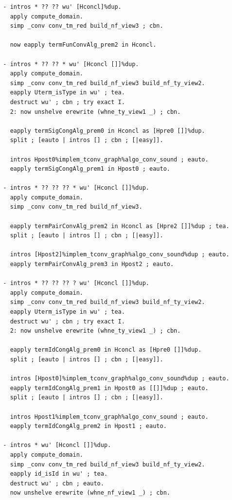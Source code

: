 \documentclass[10pt,a4paper]{amsart}
\begin{document}
\begin{lstlisting}
  - intros * ?? ?? wu' [Hconcl]%dup.
    apply compute_domain.
    simp _conv conv_tm_red build_nf_view3 ; cbn.

    now eapply termFunConvAlg_prem2 in Hconcl.

  - intros * ?? ?? * wu' [Hconcl []]%dup.
    apply compute_domain.
    simp _conv conv_tm_red build_nf_view3 build_nf_ty_view2.
    eapply Uterm_isType in wu' ; tea.
    destruct wu' ; cbn ; try exact I.
    2: now unshelve erewrite (whne_ty_view1 _) ; cbn.

    eapply termSigCongAlg_prem0 in Hconcl as [Hpre0 []]%dup.
    split ; [eauto | intros [] ; cbn ; [|easy]].

    intros Hpost0%implem_tconv_graph%algo_conv_sound ; eauto.
    eapply termSigCongAlg_prem1 in Hpost0 ; eauto.

  - intros * ?? ?? ?? * wu' [Hconcl []]%dup.
    apply compute_domain.
    simp _conv conv_tm_red build_nf_view3.

    eapply termPairConvAlg_prem2 in Hconcl as [Hpre2 []]%dup ; tea.
    split ; [eauto | intros [] ; cbn ; [|easy]].

    intros [Hpost2]%implem_tconv_graph%algo_conv_sound%dup ; eauto.
    eapply termPairConvAlg_prem3 in Hpost2 ; eauto.

  - intros * ?? ?? ?? ? wu' [Hconcl []]%dup.
    apply compute_domain.
    simp _conv conv_tm_red build_nf_view3 build_nf_ty_view2.
    eapply Uterm_isType in wu' ; tea.
    destruct wu' ; cbn ; try exact I.
    2: now unshelve erewrite (whne_ty_view1 _) ; cbn.

    eapply termIdCongAlg_prem0 in Hconcl as [Hpre0 []]%dup.
    split ; [eauto | intros [] ; cbn ; [|easy]].

    intros [Hpost0]%implem_tconv_graph%algo_conv_sound%dup ; eauto.
    eapply termIdCongAlg_prem1 in Hpost0 as [[]]%dup ; eauto.
    split ; [eauto | intros [] ; cbn ; [|easy]].

    intros Hpost1%implem_tconv_graph%algo_conv_sound ; eauto.
    eapply termIdCongAlg_prem2 in Hpost1 ; eauto.

  - intros * wu' [Hconcl []]%dup.
    apply compute_domain.
    simp _conv conv_tm_red build_nf_view3 build_nf_ty_view2.
    eapply id_isId in wu' ; tea.
    destruct wu' ; cbn ; eauto.
    now unshelve erewrite (whne_nf_view1 _) ; cbn.


\end{lstlisting}
\end{document}
